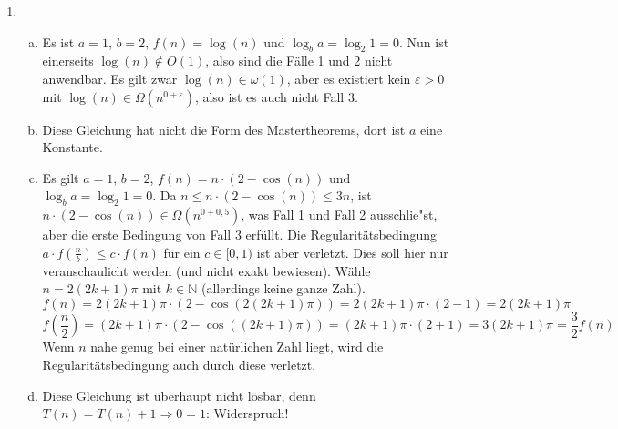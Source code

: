 \documentclass{scrartcl}
\begin{document}
\begin{enumerate}[(1)]
\item \begin{enumerate}[(a)]
\item Es ist $a=1$, $b=2$, $f(n)=\log(n)$ und $\log_b a=\log_2 1=0$. Nun ist einerseits $\log(n)\notin O(1)$, also sind die F\"alle 1 und 2 nicht anwendbar. Es gilt zwar $\log(n)\in\omega(1)$, aber es existiert kein $\varepsilon >0$ mit $\log(n)\in\Omega(n^{0+\varepsilon})$, also ist es auch nicht Fall 3.
\item Diese Gleichung hat nicht die Form des Mastertheorems, dort ist $a$ eine Konstante.
\item Es gilt $a=1$, $b=2$, $f(n)=n\cdot (2-\cos(n))$ und $\log_b a=\log_2 1=0$. Da $n\leq n\cdot (2-\cos(n))\leq 3n$, ist $n\cdot (2-\cos(n))\in \Omega(n^{0+0,5})$, was Fall 1 und Fall 2 ausschlie"st, aber die erste Bedingung von Fall 3 erf\"ullt. Die Regularit\"atsbedingung $a\cdot f(\frac{n}{b})\leq c\cdot f(n)$ f\"ur ein $c\in[0,1)$ ist aber verletzt. Dies soll hier nur veranschaulicht werden (und nicht exakt bewiesen). W\"ahle $n=2(2k+1)\pi$ mit $k\in\mathbb{N}$ (allerdings keine ganze Zahl).
$$f(n)=2(2k+1)\pi\cdot(2-\cos(2(2k+1)\pi))=2(2k+1)\pi\cdot(2-1)=2(2k+1)\pi$$
$$f(\frac{n}{2})=(2k+1)\pi\cdot(2-\cos((2k+1)\pi))=(2k+1)\pi\cdot(2+1)=3(2k+1)\pi=\frac{3}{2}f(n)$$
Wenn $n$ nahe genug bei einer nat\"urlichen Zahl liegt, wird die Regularit\"atsbedingung auch durch diese verletzt.
\item Diese Gleichung ist \"uberhaupt nicht l\"osbar, denn $T(n)=T(n)+1\Rightarrow 0=1$: Widerspruch!
\end{enumerate}

\end{enumerate}
\end{document}
